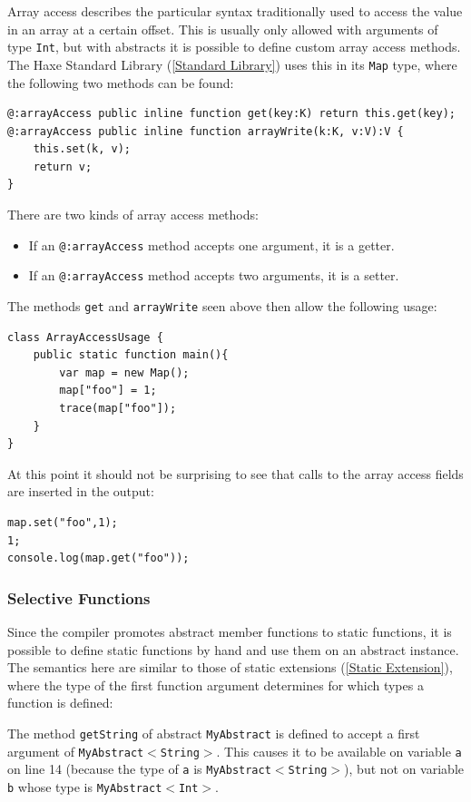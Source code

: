 \documentclass{article}
\newcommand{\type}[1]{\texttt{#1}}
\newcommand{\expr}[1]{\texttt{#1}}
\newcommand{\tref}[2]{#1 (\ref{#2})}
\begin{document}
Array access describes the particular syntax traditionally used to access the value in an array at a certain offset. This is usually only allowed with arguments of type \type{Int}, but with abstracts it is possible to define custom array access methods. The \tref{Haxe Standard Library}{Standard Library} uses this in its \type{Map} type, where the following two methods can be found:

\begin{lstlisting}
@:arrayAccess public inline function get(key:K) return this.get(key);
@:arrayAccess public inline function arrayWrite(k:K, v:V):V {
	this.set(k, v);
	return v;
}
\end{lstlisting}
There are two kinds of array access methods:

\begin{itemize}
	\item If an \expr{@:arrayAccess} method accepts one argument, it is a getter.
	\item If an \expr{@:arrayAccess} method accepts two arguments, it is a setter.
\end{itemize}
The methods \expr{get} and \expr{arrayWrite} seen above then allow the following usage:

\begin{lstlisting}
class ArrayAccessUsage {
	public static function main(){
		var map = new Map();
		map["foo"] = 1;
		trace(map["foo"]);
	}
}
\end{lstlisting}
At this point it should not be surprising to see that calls to the array access fields are inserted in the output:

\begin{lstlisting}
map.set("foo",1);
1;
console.log(map.get("foo"));
\end{lstlisting}


\subsubsection{Selective Functions}
\label{Selective Functions}

Since the compiler promotes abstract member functions to static functions, it is possible to define static functions by hand and use them on an abstract instance. The semantics here are similar to those of \tref{static extensions}{Static Extension}, where the type of the first function argument determines for which types a function is defined:


The method \expr{getString} of abstract \type{MyAbstract} is defined to accept a first argument of \type{MyAbstract$<$String$>$}. This causes it to be available on variable \expr{a} on line 14 (because the type of \expr{a} is \type{MyAbstract$<$String$>$}), but not on variable \expr{b} whose type is \type{MyAbstract$<$Int$>$}.
\end{document}
